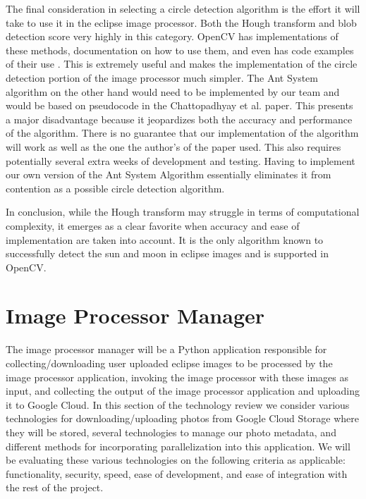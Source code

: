 \documentclass[10pt, onecolumn, draftclsnofoot, letterpaper, compsoc]{IEEEtran}
\begin{document}
The final consideration in selecting a circle detection algorithm is the effort
it will take to use it in the eclipse image processor. Both the Hough transform
and blob detection score very highly in this category. OpenCV has
implementations of these methods, documentation on how to use them, and even has
code examples of their use \cite{houghocv, blobarticle}. This is extremely useful
and makes the implementation of the circle detection portion of the image
processor much simpler. The Ant System algorithm on the other hand would need to
be implemented by our team and would be based on pseudocode in the Chattopadhyay
et al. paper. This presents a major disadvantage because it jeopardizes both the
accuracy and performance of the algorithm. There is no guarantee that our
implementation of the algorithm will work as well as the one the author’s of the
paper used. This also requires potentially several extra weeks of development
and testing. Having to implement our own version of the Ant System Algorithm
essentially eliminates it from contention as a possible circle detection
algorithm.


In conclusion, while the Hough transform may struggle in terms of computational
complexity, it emerges as a clear favorite when accuracy and ease of
implementation are taken into account. It is the only algorithm known to
successfully detect the sun and moon in eclipse images and is supported in
OpenCV.

\section{Image Processor Manager}

The image processor manager will be a Python application responsible for  
collecting/downloading user uploaded eclipse images to be processed by the image
processor application, invoking the image processor with these images as input,
and collecting the output of the image processor application and uploading it
to Google Cloud. In this section of the technology review we consider various
technologies for downloading/uploading photos from Google Cloud Storage where
they will be stored, several technologies to manage our photo metadata, and
different methods for incorporating parallelization into this application. We will
be evaluating these various technologies on the following criteria as applicable:
functionality, security, speed, ease of development, and ease of integration with
the rest of the project. \\
\end{document}
